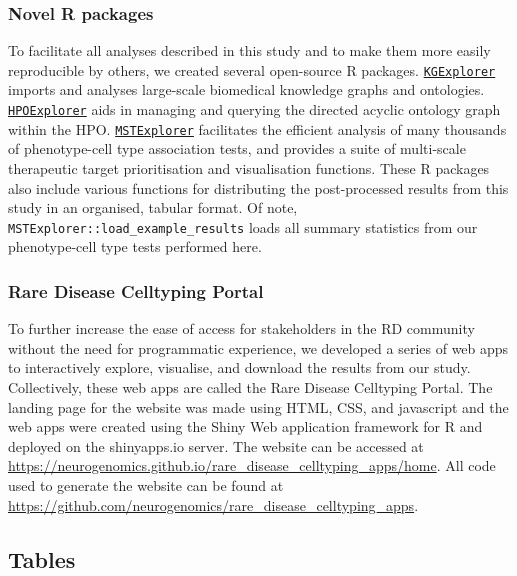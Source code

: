 \documentclass[
]{article}
\begin{document}
\subsubsection{Novel R packages}\label{novel-r-packages}

To facilitate all analyses described in this study and to make them more
easily reproducible by others, we created several open-source R
packages.
\href{https://github.com/neurogenomics/KGExplorer}{\texttt{KGExplorer}}
imports and analyses large-scale biomedical knowledge graphs and
ontologies.
\href{https://github.com/neurogenomics/HPOExplorer}{\texttt{HPOExplorer}}
aids in managing and querying the directed acyclic ontology graph within
the HPO.
\href{https://github.com/neurogenomics/MSTExplorer}{\texttt{MSTExplorer}}
facilitates the efficient analysis of many thousands of phenotype-cell
type association tests, and provides a suite of multi-scale therapeutic
target prioritisation and visualisation functions. These R packages also
include various functions for distributing the post-processed results
from this study in an organised, tabular format. Of note,
\texttt{MSTExplorer::load\_example\_results} loads all summary
statistics from our phenotype-cell type tests performed here.

\subsubsection{Rare Disease Celltyping
Portal}\label{rare-disease-celltyping-portal}

To further increase the ease of access for stakeholders in the RD
community without the need for programmatic experience, we developed a
series of web apps to interactively explore, visualise, and download the
results from our study. Collectively, these web apps are called the Rare
Disease Celltyping Portal. The landing page for the website was made
using HTML, CSS, and javascript and the web apps were created using the
Shiny Web application framework for R and deployed on the shinyapps.io
server. The website can be accessed at
\url{https://neurogenomics.github.io/rare_disease_celltyping_apps/home}.
All code used to generate the website can be found at
\url{https://github.com/neurogenomics/rare_disease_celltyping_apps}.

\newpage{}

\subsection{Tables}\label{tables}
\end{document}
